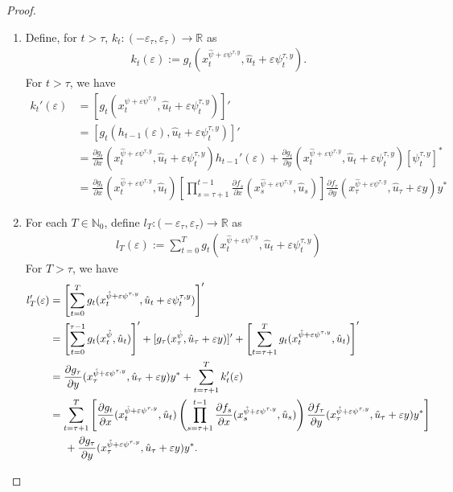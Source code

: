 \documentclass[3p]{elsarticle}
\newcommand{\rz}{\mathbb R}
\newcommand{\nat}{\mathbb N_0}
\begin{document}
\begin{proof}
\begin{enumerate}
			\item[(b)] Define, for $t>\tau$, $k_t:(-\varepsilon_\tau,\varepsilon_\tau)\to\rz$ as
			\begin{align*}
			k_t(\varepsilon):=g_t(x_t^{\hat{\psi}+\varepsilon\psi^{\tau,y}},\hat u_t+\varepsilon\psi^{\tau,y}_t).
			\end{align*}
			For $t>\tau$, we have
			\begin{align*}
			k_t'(\varepsilon)&=[g_t(x_t^{\hat{\psi}+\varepsilon\psi^{\tau,y}},\hat u_t+\varepsilon\psi^{\tau,y}_t)]'\\
			&=[g_t(h_{t-1}(\varepsilon),\hat u_t+\varepsilon\psi^{\tau,y}_t)]'\\
			&=\frac{\partial g_t}{\partial x}(x_t^{\hat{\psi}+\varepsilon\psi^{\tau,y}},\hat u_t+\varepsilon\psi^{\tau,y}_t)h_{t-1}'(\varepsilon)+\frac{\partial g_t}{\partial y}(x_t^{\hat{\psi}+\varepsilon\psi^{\tau,y}},\hat u_t+\varepsilon\psi^{\tau,y}_t)[\psi^{\tau,y}_{t}]^*\\
			&=\frac{\partial g_t}{\partial x}(x_t^{\hat{\psi}+\varepsilon\psi^{\tau,y}},\hat u_t)\displaystyle\left[ \prod_{s=\tau+1}^{t-1}\frac{\partial f_s}{\partial x}(x_s^{\hat{\psi}+\varepsilon\psi^{\tau,y}},\hat u_s)\right] \frac{\partial f_\tau}{\partial y}(x_\tau^{\hat{\psi}+\varepsilon\psi^{\tau,y}},\hat u_\tau+\varepsilon y)y^*
			\end{align*}
			\item[(c)] For each $T\in\nat$, define $l_T:\mathcal (-\varepsilon_\tau,\varepsilon_\tau)\to\mathbb R$ as 
			\begin{align*}
			l_T(\varepsilon):=\sum_{t=0}^T g_t(x_t^{\hat{\psi}+\varepsilon\psi^{\tau,y}},\hat u_t+\varepsilon \psi_t^{\tau,y})
			\end{align*}
			For $T>\tau$, we have 
			\begin{align*}
			l'_T(\varepsilon)&=\left[ \sum_{t=0}^T g_t(x_t^{\hat{\psi}+\varepsilon\psi^{\tau,y}},\hat u_t+\varepsilon \psi_t^{\tau,y}) \right]'\\
			&=\left[ \sum_{t=0}^{\tau-1} g_t(x_t^{\hat{\psi}},\hat u_t) \right]'+[ g_\tau(x_\tau^{\hat{\psi}},\hat u_\tau+\varepsilon y)]'+\left[ \sum_{t=\tau+1}^T g_t(x_t^{\hat{\psi}+\varepsilon\psi^{\tau,y}},\hat u_t) \right]'\\
			&= \frac{\partial g_\tau}{\partial y}(x_\tau^{\hat{\psi}+\varepsilon\psi^{\tau,y}},\hat u_\tau+\varepsilon y)y^*+ \sum_{t=\tau+1}^T k_t'(\varepsilon)\\
			&= \sum_{t=\tau+1}^T\left[\frac{\partial g_t}{\partial x}(x_t^{\hat{\psi}+\varepsilon\psi^{\tau,y}},\hat u_t)\displaystyle\left( \prod_{s=\tau+1}^{t-1}\frac{\partial f_s}{\partial x}(x_s^{\hat{\psi}+\varepsilon\psi^{\tau,y}},\hat u_s)\right) \frac{\partial f_\tau}{\partial y}(x_\tau^{\hat{\psi}+\varepsilon\psi^{\tau,y}},\hat u_\tau+\varepsilon y)y^*\right]\\
			&\hspace{0.5cm}+ \frac{\partial g_\tau}{\partial y}(x_\tau^{\hat{\psi}+\varepsilon\psi^{\tau,y}},\hat u_\tau+\varepsilon y)y^*.
			\end{align*}
			

\end{enumerate}
\end{proof}
\end{document}
